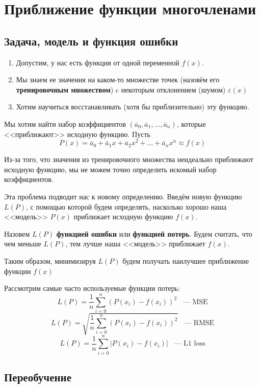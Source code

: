 \section{Приближение функции многочленами}
\subsection{Задача, модель и функция ошибки}
\begin{enumerate}
    \item Допустим, у нас есть функция от одной переменной $f(x)$.
    \item Мы знаем ее значения на каком-то множестве точек (назовём его \textbf{тренировочным множеством}) c некоторым отклонением (шумом) $\varepsilon(x)$
    \item Хотим научиться восстанавливать (хотя бы приблизительно) эту функцию. 
\end{enumerate}

Мы хотим найти набор коэффициентов $(\overline a_0, \overline a_1, \dots, \overline a_n)$, которые  <<приближают>>  исходную функцию.
Пусть 
$$P(x) = \overline a_0 + \overline a_1 x + \overline a_2 x^2 + \dots + \overline a_n x^n \approx f(x)$$

Из-за того, что значения из тренировочного множества неидеально приближают исходную функцию, мы не можем точно определить искомый набор коэффициентов.

Эта проблема подводит нас к новому определению. Введём новую функцию $L(P)$, с помощью которой будем определять, насколько хорошо наша <<модель>> $P(x)$ приближает исходную функцию $f(x)$. 

Назовем $L(P)$ \textbf{функцией ошибки} или \textbf{функцией потерь}. Будем считать, что чем меньше $L(P)$, тем лучше наша <<модель>> приближает $f(x)$. 

Таким образом, минимизируя $L(P)$ будем получать наилучшее приближение функции $f(x)$

Рассмотрим самые часто используемые функции потерь:
    $$L(P) = \frac{1}{n}\sum^n_{i=0} (P(x_i) - f(x_i))^2 \hspace{10pt} \text{--- MSE}$$
    $$L(P) = \sqrt{\frac{1}{n}\sum^n_{i=0} (P(x_i) - f(x_i))^2} \hspace{10pt} \text{--- RMSE}$$
    $$L(P) = \frac{1}{n}\sum^n_{i=0} |P(x_i) - f(x_i)| \hspace{10pt} \text{--- L1 loss}$$
    
\subsection{Переобучение}

